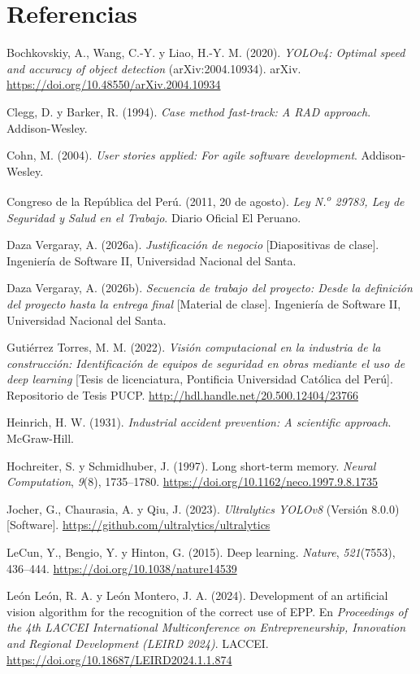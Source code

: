 \documentclass[12pt,a4paper]{article}
\newcommand{\seccionsinnumero}[1]{\section*{#1}\addcontentsline{toc}{section}{#1}}
\newenvironment{referencias}{\par\setlength{\parindent}{0pt}\singlespacing
  \setlength{\parskip}{8pt}\everypar{\hangindent=1.27cm\hangafter=1}}{\par}
\begin{document}
\FloatBarrier
\newpage
\seccionsinnumero{Referencias}
\begin{referencias}

Bochkovskiy, A., Wang, C.-Y. y Liao, H.-Y. M. (2020). \textit{YOLOv4: Optimal speed and accuracy of object detection} (arXiv:2004.10934). arXiv. \url{https://doi.org/10.48550/arXiv.2004.10934}

Clegg, D. y Barker, R. (1994). \textit{Case method fast-track: A RAD approach}. Addison-Wesley.

Cohn, M. (2004). \textit{User stories applied: For agile software development}. Addison-Wesley.

Congreso de la República del Perú. (2011, 20 de agosto). \textit{Ley N.\textsuperscript{o} 29783, Ley de Seguridad y Salud en el Trabajo}. Diario Oficial El Peruano.

Daza Vergaray, A. (2026a). \textit{Justificación de negocio} [Diapositivas de clase]. Ingeniería de Software II, Universidad Nacional del Santa.

Daza Vergaray, A. (2026b). \textit{Secuencia de trabajo del proyecto: Desde la definición del proyecto hasta la entrega final} [Material de clase]. Ingeniería de Software II, Universidad Nacional del Santa.

Gutiérrez Torres, M. M. (2022). \textit{Visión computacional en la industria de la construcción: Identificación de equipos de seguridad en obras mediante el uso de deep learning} [Tesis de licenciatura, Pontificia Universidad Católica del Perú]. Repositorio de Tesis PUCP. \url{http://hdl.handle.net/20.500.12404/23766}

Heinrich, H. W. (1931). \textit{Industrial accident prevention: A scientific approach}. McGraw-Hill.

Hochreiter, S. y Schmidhuber, J. (1997). Long short-term memory. \textit{Neural Computation}, \textit{9}(8), 1735--1780. \url{https://doi.org/10.1162/neco.1997.9.8.1735}

Jocher, G., Chaurasia, A. y Qiu, J. (2023). \textit{Ultralytics YOLOv8} (Versión 8.0.0) [Software]. \url{https://github.com/ultralytics/ultralytics}

LeCun, Y., Bengio, Y. y Hinton, G. (2015). Deep learning. \textit{Nature}, \textit{521}(7553), 436--444. \url{https://doi.org/10.1038/nature14539}

León León, R. A. y León Montero, J. A. (2024). Development of an artificial vision algorithm for the recognition of the correct use of EPP. En \textit{Proceedings of the 4th LACCEI International Multiconference on Entrepreneurship, Innovation and Regional Development (LEIRD 2024)}. LACCEI. \url{https://doi.org/10.18687/LEIRD2024.1.1.874}


\end{referencias}
\end{document}
